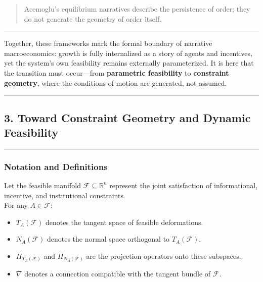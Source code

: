 \documentclass[11pt]{article}
\begin{document}
\begin{quote}
Acemoglu's equilibrium narratives describe the persistence of order;
they do not generate the geometry of order itself.
\end{quote}

\begin{center}\rule{0.5\linewidth}{0.5pt}\end{center}

Together, these frameworks mark the formal boundary of narrative
macroeconomics: growth is fully internalized as a story of agents and
incentives, yet the system's own feasibility remains externally
parameterized. It is here that the transition must occur---from
\textbf{parametric feasibility} to \textbf{constraint geometry}, where
the conditions of motion are generated, not assumed.

\begin{center}\rule{0.5\linewidth}{0.5pt}\end{center}

\subsection{3. Toward Constraint Geometry and Dynamic
Feasibility}\label{toward-constraint-geometry-and-dynamic-feasibility}

\begin{center}\rule{0.5\linewidth}{0.5pt}\end{center}

\subsubsection{Notation and Definitions}\label{notation-and-definitions}

Let the feasible manifold \(\mathcal{F}\subseteq\mathbb{R}^n\) represent
the joint satisfaction of informational, incentive, and institutional
constraints.\\
For any \(A\in\mathcal{F}\):

\begin{itemize}
\tightlist
\item
  \(T_A(\mathcal{F})\) denotes the tangent space of feasible
  deformations.
\item
  \(N_A(\mathcal{F})\) denotes the normal space orthogonal to
  \(T_A(\mathcal{F})\).
\item
  \(\Pi_{T_A(\mathcal{F})}\) and \(\Pi_{N_A(\mathcal{F})}\) are the
  projection operators onto these subspaces.
\item
  \(\nabla\) denotes a connection compatible with the tangent bundle of
  \(\mathcal{F}\).
\end{itemize}
\end{document}
